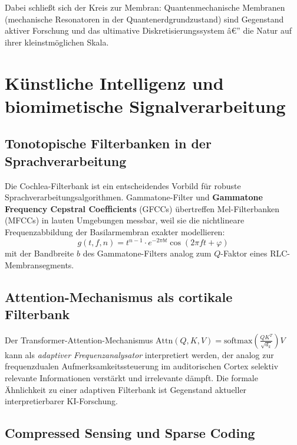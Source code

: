 ﻿\documentclass[12pt,a4paper,titlepage]{report}
\begin{document}
Dabei schließt sich der Kreis zur Membran: Quantenmechanische Membranen
(mechanische Resonatoren in der Quantenerdgrundzustand) sind Gegenstand aktiver
Forschung und das ultimative Diskretisierungssystem â€” die Natur auf ihrer
kleinstmöglichen Skala.

\section{Künstliche Intelligenz und biomimetische Signalverarbeitung}

\subsection{Tonotopische Filterbanken in der Sprachverarbeitung}

Die Cochlea-Filterbank ist ein entscheidendes Vorbild für robuste
Sprachverarbeitungsalgorithmen. Gammatone-Filter und \textbf{Gammatone Frequency
Cepstral Coefficients} (GFCCs) übertreffen Mel-Filterbanken (MFCCs) in lauten
Umgebungen messbar, weil sie die nichtlineare Frequenzabbildung der Basilarmembran
exakter modellieren:
\[
    g(t, f, n) = t^{n-1} \cdot e^{-2\pi bt} \cos(2\pi f t + \varphi)
\]
mit der Bandbreite $b$ des Gammatone-Filters analog zum $Q$-Faktor eines
RLC-Membran\-segments.

\subsection{Attention-Mechanismus als cortikale Filterbank}

Der Transformer-Attention-Mechanismus $\mathrm{Attn}(Q,K,V) = \mathrm{softmax}\!\left(\frac{QK^T}{\sqrt{d_k}}\right)V$
kann als \emph{adaptiver Frequenzanalysator} interpretiert werden, der analog
zur frequenzdualen Aufmerksamkeitssteuerung im auditorischen Cortex selektiv
relevante Informationen verstärkt und irrelevante dämpft. Die formale Ähnlichkeit
zu einer adaptiven Filterbank ist Gegenstand aktueller interpretierbarer KI-Forschung.

\subsection{Compressed Sensing und Sparse Coding}
\end{document}
